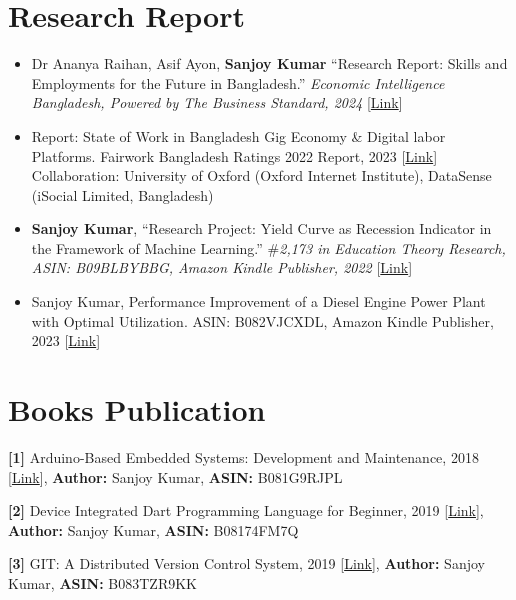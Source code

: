 \documentclass[10pt,letterpaper]{article}
\newcommand{\lk}[2]{[\href{#1}{#2}]}
\begin{document}
\section{Research Report}
\begin{itemize}
  \item Dr Ananya Raihan, Asif Ayon, \textbf{Sanjoy Kumar} ``Research Report: Skills and Employments for the Future in Bangladesh.'' \textit{Economic Intelligence Bangladesh, Powered by The Business Standard, 2024} \lk{https://intel.tbsnews.net/issue-2/\#:~:text=SHIFT\%20IN\%20JOB,Kumar\%20from\%20DataSense}{Link}
  \item Report: State of Work in Bangladesh Gig Economy \& Digital labor Platforms. Fairwork Bangladesh Ratings 2022 Report, 2023 \lk{https://fair.work/wp-content/uploads/sites/17/2022/10/Fairwork-Bangladesh-Ratings-2022-FINAL-REPORT.pdf}{Link} Collaboration: University of Oxford (Oxford Internet Institute), DataSense (iSocial Limited, Bangladesh)
  \item \textbf{Sanjoy Kumar}, ``Research Project: Yield Curve as Recession Indicator in the Framework of Machine Learning.'' \#\textit{2,173 in Education Theory Research, ASIN: B09BLBYBBG, Amazon Kindle Publisher, 2022} \lk{https://www.amazon.com/Recession-Indicator-framework-Machine-Learning-ebook/dp/B09BLBYBBG/ref=sr_1_5?qid=1655359228&refinements=p_27\%3ASanjoy+Kumar&s=digital-text&sr=1-5&text=Sanjoy+Kumar}{Link}
  \item Sanjoy Kumar, Performance Improvement of a Diesel Engine Power Plant with Optimal Utilization. ASIN: B082VJCXDL, Amazon Kindle Publisher, 2023 \lk{https://www.amazon.com/Performance-Improvement-Diesel-Optimal-utilization-ebook/dp/B082VJBXDL/ref=sr_1_9?dib=eyJ2IjoiMSJ9.NF2a3FWT6lEDjeN_mcFz2POLADdmM5fFfb4xCSSWdUwyAI2oPvjf5l5ds_TgdwZ72JEb9H0Ntn7Dckb6EYIIXafyZ6LysJNWY8ln1vvQWdose4EXlDMD_PEifm6yBGbnaRDxfMy0k3vfC95McbA853mBqThpmafT_BVKBKi1W4FexL-ws76ECRBRqj20cDsvZVyOW7NrB3cdMDsW2uTXQ0GvPEsjJYz-if_fN5GFoeM.CV7meWIfAHGo1M5FA24zyB4JOpnCFAK1MzzoynKRdf4&dib_tag=se&qid=1716931223&refinements=p_27\%3ASanjoy+Kumar&s=digital-text&sr=1-9&text=Sanjoy+Kumar}{Link}
\end{itemize}

\section{Books Publication}
\textbf{[1]} Arduino-Based Embedded Systems: Development and Maintenance, 2018 \lk{https://www.amazon.com/Troubleshooting-Maintaining-Arduino-Upgrading-Project-ebook/dp/B081G9RJPL/ref=sr_1_12?qid=1655360741&refinements=p_27\%3ASanjoy+Kumar&s=digital-text&sr=1-12&text=Sanjoy+Kumar}{Link}, \textbf{Author:} Sanjoy Kumar, \textbf{ASIN:} B081G9RJPL\par
\textbf{[2]} Device Integrated Dart Programming Language for Beginner, 2019 \lk{https://www.amazon.com/dp/B08174FM7Q}{Link}, \textbf{Author:} Sanjoy Kumar, \textbf{ASIN:} B08174FM7Q\par
\textbf{[3]} GIT: A Distributed Version Control System, 2019 \lk{https://www.amazon.com/dp/B083TZR9KK}{Link}, \textbf{Author:} Sanjoy Kumar, \textbf{ASIN:} B083TZR9KK\par
\end{document}
